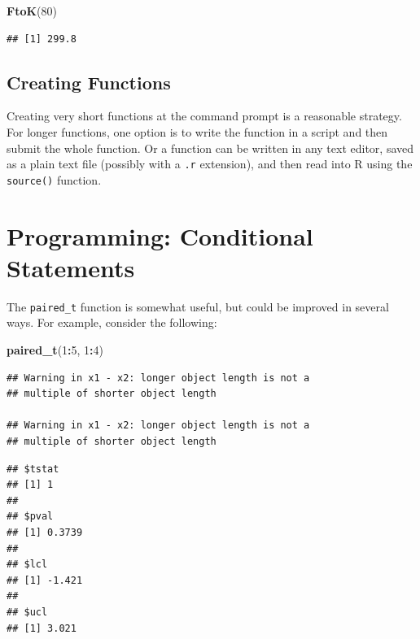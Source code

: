 \documentclass[
]{krantz}
\newenvironment{Shaded}{\begin{snugshade}}{\end{snugshade}}
\newcommand{\DecValTok}[1]{\textcolor[rgb]{0.00,0.00,0.81}{#1}}
\newcommand{\KeywordTok}[1]{\textcolor[rgb]{0.13,0.29,0.53}{\textbf{#1}}}
\newcommand{\NormalTok}[1]{#1}
\newcommand{\OperatorTok}[1]{\textcolor[rgb]{0.81,0.36,0.00}{\textbf{#1}}}
\begin{document}
\begin{Shaded}
\begin{Highlighting}[]
\KeywordTok{FtoK}\NormalTok{(}\DecValTok{80}\NormalTok{)}
\end{Highlighting}
\end{Shaded}

\begin{verbatim}
## [1] 299.8
\end{verbatim}

\hypertarget{creating-functions}{%
\subsection{Creating Functions}\label{creating-functions}}

Creating very short functions at the command prompt is a reasonable strategy. For longer functions, one option is to write the function in a script and then submit the whole function. Or a function can be written in any text editor, saved as a plain text file (possibly with a \texttt{.r} extension), and then read into R using the \texttt{source()} function.

\hypertarget{programming-conditional-statements}{%
\section{Programming: Conditional Statements}\label{programming-conditional-statements}}

The \texttt{paired\_t} function is somewhat useful, but could be improved in several ways. For example, consider the following:

\begin{Shaded}
\begin{Highlighting}[]
\KeywordTok{paired\_t}\NormalTok{(}\DecValTok{1}\OperatorTok{:}\DecValTok{5}\NormalTok{, }\DecValTok{1}\OperatorTok{:}\DecValTok{4}\NormalTok{)}
\end{Highlighting}
\end{Shaded}

\begin{verbatim}
## Warning in x1 - x2: longer object length is not a
## multiple of shorter object length

## Warning in x1 - x2: longer object length is not a
## multiple of shorter object length
\end{verbatim}

\begin{verbatim}
## $tstat
## [1] 1
## 
## $pval
## [1] 0.3739
## 
## $lcl
## [1] -1.421
## 
## $ucl
## [1] 3.021
\end{verbatim}
\end{document}
